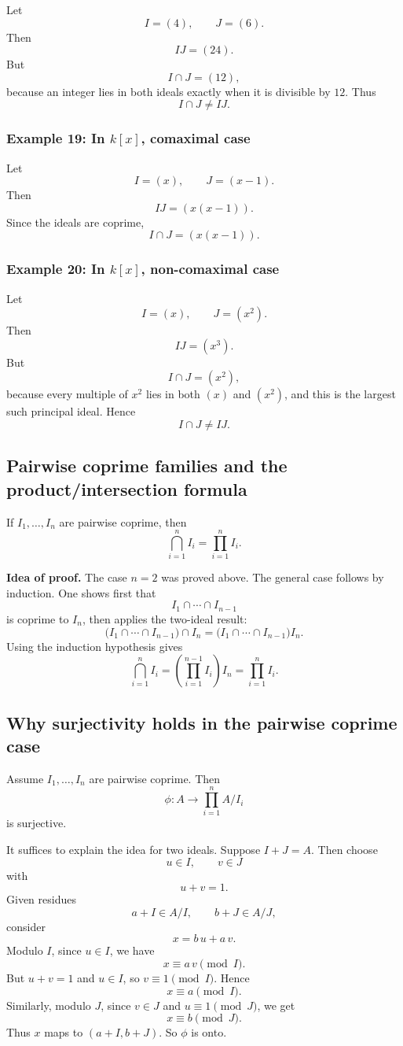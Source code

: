 \documentclass[12pt,a4paper]{article}
\theoremstyle{notespace}
\begin{document}
Let
\[
I=(4),\qquad J=(6).
\]
Then
\[
IJ=(24).
\]
But
\[
I\cap J=(12),
\]
because an integer lies in both ideals exactly when it is divisible by \(12\). Thus
\[
I\cap J\neq IJ.
\]

\subsubsection*{Example 19: In \(k[x]\), comaximal case}

Let
\[
I=(x),\qquad J=(x-1).
\]
Then
\[
IJ=(x(x-1)).
\]
Since the ideals are coprime,
\[
I\cap J=(x(x-1)).
\]

\subsubsection*{Example 20: In \(k[x]\), non-comaximal case}

Let
\[
I=(x),\qquad J=(x^2).
\]
Then
\[
IJ=(x^3).
\]
But
\[
I\cap J=(x^2),
\]
because every multiple of \(x^2\) lies in both \((x)\) and \((x^2)\), and this is the largest such principal ideal. Hence
\[
I\cap J\neq IJ.
\]

\subsection{Pairwise coprime families and the product/intersection formula}

If \(I_1,\dots,I_n\) are pairwise coprime, then
\[
\bigcap_{i=1}^n I_i=\prod_{i=1}^n I_i.
\]

\textbf{Idea of proof.}
The case \(n=2\) was proved above. The general case follows by induction. One shows first that
\[
I_1\cap\cdots\cap I_{n-1}
\]
is coprime to \(I_n\), then applies the two-ideal result:
\[
\big(I_1\cap\cdots\cap I_{n-1}\big)\cap I_n
=
\big(I_1\cap\cdots\cap I_{n-1}\big)I_n.
\]
Using the induction hypothesis gives
\[
\bigcap_{i=1}^n I_i
=
\left(\prod_{i=1}^{n-1} I_i\right)I_n
=
\prod_{i=1}^n I_i.
\]

\subsection{Why surjectivity holds in the pairwise coprime case}

Assume \(I_1,\dots,I_n\) are pairwise coprime. Then
\[
\phi:A\to \prod_{i=1}^n A/I_i
\]
is surjective.

It suffices to explain the idea for two ideals. Suppose \(I+J=A\). Then choose
\[
u\in I,\qquad v\in J
\]
with
\[
u+v=1.
\]
Given residues
\[
a+I\in A/I,\qquad b+J\in A/J,
\]
consider
\[
x=b\,u+a\,v.
\]
Modulo \(I\), since \(u\in I\), we have
\[
x\equiv a\,v \pmod I.
\]
But \(u+v=1\) and \(u\in I\), so \(v\equiv 1\pmod I\). Hence
\[
x\equiv a \pmod I.
\]
Similarly, modulo \(J\), since \(v\in J\) and \(u\equiv 1\pmod J\), we get
\[
x\equiv b \pmod J.
\]
Thus \(x\) maps to \((a+I,b+J)\). So \(\phi\) is onto.
\end{document}
